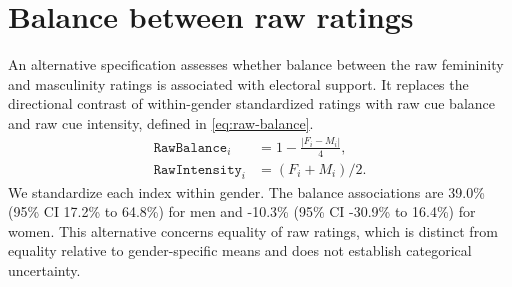 \documentclass[11pt,a4paper]{article}\usepackage[]{graphicx}\usepackage[]{xcolor}
\begin{document}
\section{Balance between raw ratings}
\label{sec:oa-balance}
An alternative specification assesses whether balance between the raw femininity and masculinity ratings is associated with electoral support. It replaces the directional contrast of within-gender standardized ratings with raw cue balance and raw cue intensity, defined in \autoref{eq:raw-balance}.
\begin{equation}
\begin{aligned}
 \texttt{RawBalance}_i &= 1-\frac{|F_i-M_i|}{4},\\
 \texttt{RawIntensity}_i &= (F_i+M_i)/2.
\end{aligned}
\label{eq:raw-balance}
\end{equation}
We standardize each index within gender. The balance associations are 39.0\% (95\% CI 17.2\% to 64.8\%) for men and -10.3\% (95\% CI -30.9\% to 16.4\%) for women. This alternative concerns equality of raw ratings, which is distinct from equality relative to gender-specific means and does not establish categorical uncertainty.
\end{document}
